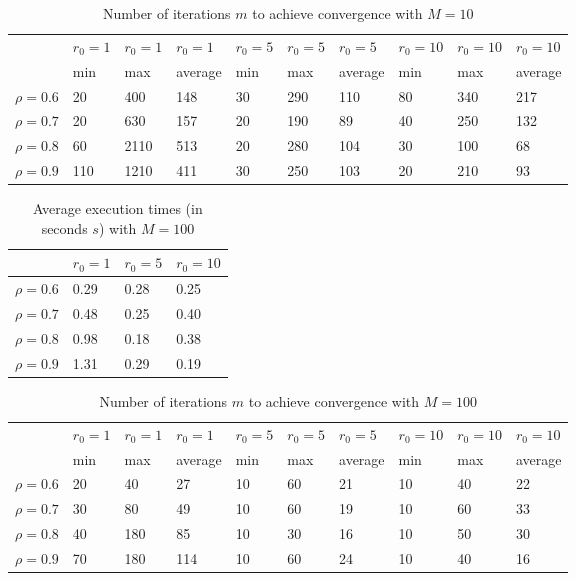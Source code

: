 \documentclass[a4paper,11pt,openright]{report}
\begin{document}
\begin{table}[H]
\centering
\addtolength{\leftskip}{-1.5cm}
\addtolength{\rightskip}{-1.5cm}
\begin{tabular}{|c|lllllllll|}
\hline
$ $ & $r_0 = 1$ & $r_0 = 1$ & $r_0 = 1$ & $r_0 = 5$ & $r_0 = 5$ & $r_0 = 5$ & $r_0 = 10$ & $r_0 = 10$ & $r_0 = 10$  \\
$ $ & min & max & average & min & max & average & min & max & average \\ 
\hline
$\rho = 0.6$ & 20 & 400 & 148 & 30 & 290 & 110 & 80 & 340 & 217\\

$\rho = 0.7$ & 20 & 630 & 157 & 20 & 190 & 89 & 40 & 250 & 132\\

$\rho = 0.8$ & 60 & 2110 & 513 & 20 & 280 & 104 & 30 & 100 & 68\\

$\rho = 0.9$ & 110 & 1210 & 411 & 30 & 250 & 103 & 20 & 210 & 93\\
\hline
\end{tabular}
\caption{Number of iterations $m$ to achieve convergence with $M = 10$}
\end{table}
\begin{table}[H]
\centering
\addtolength{\leftskip}{-1.5cm}
\addtolength{\rightskip}{-1.5cm}
\begin{tabular}{|c|lll|}
\hline
$ $ & $r_0 = 1$ & $r_0 = 5$ & $r_0 = 10$ \\
\hline
$\rho = 0.6$ & 0.29 & 0.28 & 0.25 \\

$\rho = 0.7$ & 0.48 & 0.25 & 0.40 \\

$\rho = 0.8$ & 0.98 & 0.18 & 0.38 \\

$\rho = 0.9$ & 1.31 & 0.29 & 0.19 \\
\hline
\end{tabular}
\caption{Average execution
 times (in seconds $s$) with $M = 100$}
\end{table}
\begin{table}[H]
\centering
\addtolength{\leftskip}{-1.5cm}
\addtolength{\rightskip}{-1.5cm}
\begin{tabular}{|c|lllllllll|}
\hline
$ $ & $r_0 = 1$ & $r_0 = 1$ & $r_0 = 1$ & $r_0 = 5$ & $r_0 = 5$ & $r_0 = 5$ & $r_0 = 10$ & $r_0 = 10$ & $r_0 = 10$  \\
$ $ & min & max & average & min & max & average & min & max & average \\ 
\hline
$\rho = 0.6$ & 20 & 40 & 27 & 10 & 60 & 21 & 10 & 40 & 22\\

$\rho = 0.7$ & 30 & 80 & 49 & 10 & 60 & 19 & 10 & 60 & 33\\

$\rho = 0.8$ & 40 & 180 & 85 & 10 & 30 & 16 & 10 & 50 & 30\\

$\rho = 0.9$ & 70 & 180 & 114 & 10 & 60 & 24 & 10 & 40 & 16\\
\hline
\end{tabular}
\caption{Number of iterations $m$ to achieve convergence with $M = 100$}
\end{table}
\end{document}
